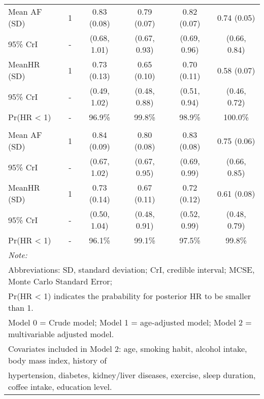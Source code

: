 \documentclass[nutrients,article,submit,moreauthors,pdftex]{mdpi}
\begin{document}
\begin{table}[!h]
{\begin{tabular}[t]{lccccc}
\rowcolor{gray!6}  \hspace{1em}Mean AF (SD) & 1 & 0.83 (0.08) & 0.79 (0.07) & 0.82 (0.07) & 0.74 (0.05)\\
\hspace{1em}95\% CrI & - & (0.68, 1.01) & (0.67, 0.93) & (0.69, 0.96) & (0.66, 0.84)\\
\rowcolor{gray!6}  \hspace{1em}MeanHR (SD) & 1 & 0.73 (0.13) & 0.65 (0.10) & 0.70 (0.11) & 0.58 (0.07)\\
\hspace{1em}95\% CrI & - & (0.49, 1.02) & (0.48, 0.88) & (0.51, 0.94) & (0.46, 0.72)\\
\rowcolor{gray!6}  \hspace{1em}Pr(HR < 1) & - & 96.9\% & 99.8\% & 98.9\% & 100.0\%\\
\addlinespace[0.3em]
\multicolumn{6}{l}{\textbf{Model 2}}\\
\hspace{1em}Mean AF (SD) & 1 & 0.84 (0.09) & 0.80 (0.08) & 0.83 (0.08) & 0.75 (0.06)\\
\rowcolor{gray!6}  \hspace{1em}95\% CrI & - & (0.67, 1.02) & (0.67, 0.95) & (0.69, 0.99) & (0.66, 0.85)\\
\hspace{1em}MeanHR (SD) & 1 & 0.73 (0.14) & 0.67 (0.11) & 0.72 (0.12) & 0.61 (0.08)\\
\rowcolor{gray!6}  \hspace{1em}95\% CrI & - & (0.50, 1.04) & (0.48, 0.91) & (0.52, 0.99) & (0.48, 0.79)\\
\hspace{1em}Pr(HR < 1) & - & 96.1\% & 99.1\% & 97.5\% & 99.8\%\\
\bottomrule
\multicolumn{6}{l}{\textit{Note: }}\\
\multicolumn{6}{l}{Abbreviations: SD, standard deviation; CrI, credible interval; MCSE, Monte Carlo Standard Error;}\\
\multicolumn{6}{l}{ Pr(HR < 1) indicates the prabability for posterior HR to be smaller than 1.}\\
\multicolumn{6}{l}{Model 0 = Crude model; Model 1 = age-adjusted model; Model 2 = multivariable adjusted model.}\\
\multicolumn{6}{l}{Covariates included in Model 2: age, smoking habit, alcohol intake, body mass index, history of}\\
\multicolumn{6}{l}{hypertension, diabetes, kidney/liver diseases, exercise, sleep duration, coffee intake, education level.}\\
\end{tabular}}
\end{table}
\end{document}
